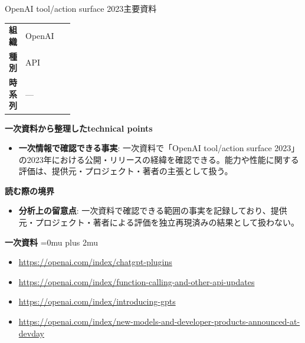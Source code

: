 \begin{technicalnote}{OpenAI tool/action surface 2023}{主要資料}
\begingroup
\begin{tabularx}{\linewidth}{@{}>{\bfseries}p{0.22\linewidth}X@{}}
組織 & OpenAI \\
種別 & API \\
時系列 & — \\
\end{tabularx}
\smallskip
{\bfseries 一次資料から整理したtechnical points}
\begin{itemize}[leftmargin=1.5em,itemsep=0.35em]
\item \textbf{一次情報で確認できる事実}: 一次資料で「OpenAI tool/action surface 2023」の2023年における公開・リリースの経緯を確認できる。能力や性能に関する評価は、提供元・プロジェクト・著者の主張として扱う。
\end{itemize}
\begin{minipage}{\linewidth}
{\bfseries 読む際の境界}
\begin{itemize}[leftmargin=1.5em,itemsep=0.35em]
\item \textbf{分析上の留意点}: 一次資料で確認できる範囲の事実を記録しており、提供元・プロジェクト・著者による評価を独立再現済みの結果として扱わない。
\end{itemize}
\begin{samepage}
{\bfseries 一次資料}
\begingroup\sloppy
\Urlmuskip=0mu plus 2mu\relax
\begin{itemize}[leftmargin=1.5em,itemsep=0.25em]
\item {\scriptsize\url{https://openai.com/index/chatgpt-plugins}}
\item {\scriptsize\url{https://openai.com/index/function-calling-and-other-api-updates}}
\item {\scriptsize\url{https://openai.com/index/introducing-gpts}}
\item {\scriptsize\url{https://openai.com/index/new-models-and-developer-products-announced-at-devday}}
\end{itemize}
\endgroup
\end{samepage}
\end{minipage}
\endgroup
\end{technicalnote}
\medskip

